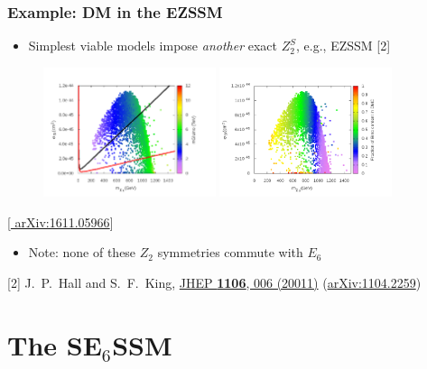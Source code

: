 \documentclass[10pt,aspectratio=169]{beamer}
\begin{document}
\begin{frame}
  \frametitle{Example: DM in the EZSSM}
  \begin{itemize} \itemsep1em
  \item Simplest viable models impose \emph{another} exact $Z_2^S$, e.g.,
    EZSSM [2]
  \end{itemize}
  \vspace*{-10pt}
  \begin{figure}
    \centering
    \hfill
    \includegraphics[width=0.45\textwidth]{ezssm_direct_detection}
    \hfill
    \includegraphics[width=0.45\textwidth]{ezssm_bino_fraction}
    \hfill
  \end{figure}
  \vspace*{-20pt}
  \begin{center}
    { \tiny [\href{http://arxiv.org/abs/1611.05966}{%
          arXiv:1611.05966}] }
  \end{center}
  \begin{itemize} \itemsep1em
  \item \alert{Note: none of these $Z_2$ symmetries commute with $E_6$}
  \end{itemize}
      {\tiny [2] J.~P.~Hall and S.~F.~King,
        \href{http://doi.org/10.1007/JHEP06(2011)006}{JHEP
          \textbf{1106}, 006 (20011)}
        (\href{http://arxiv.org/abs/1104.2259}{arXiv:1104.2259})}
\end{frame}

\section{The SE$_6$SSM}
\end{document}
